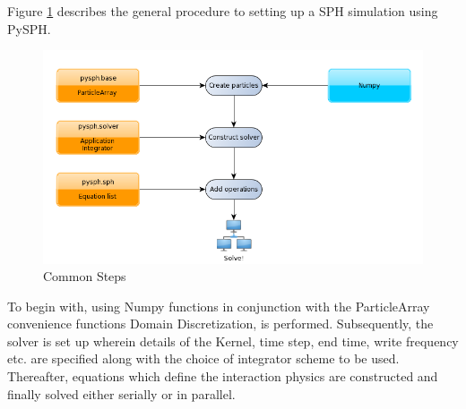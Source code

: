 Figure \ref{fig:sph_algo} describes the general procedure to setting up a SPH simulation using PySPH.  

\begin{figure}[htb!]
\centering
\setlength\fboxsep{0pt}
      \includegraphics[scale=0.5]{figures/pysph-examples-common-steps.png} 
\caption{{\small{Common Steps}}}
\label{fig:sph_algo}
\end{figure}

To begin with, using Numpy functions in conjunction with the ParticleArray convenience functions Domain Discretization, is performed. Subsequently, the solver is set up wherein details of the Kernel, time step, end time, write frequency etc. are specified along with the choice of integrator scheme to be used. Thereafter, equations which define the interaction physics are constructed and finally solved either serially or in parallel. 

